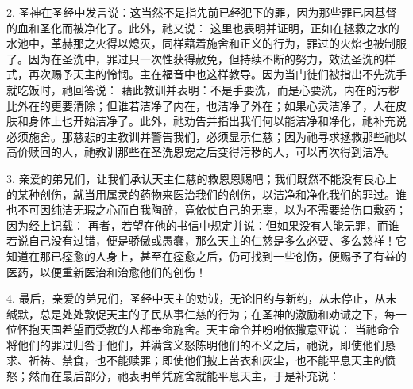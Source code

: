 2. 圣神在圣经中发言说：这当然不是指先前已经犯下的罪，因为那些罪已因基督的血和圣化而被净化了。此外，祂又说： 这里也表明并证明，正如在拯救之水的水池中，革赫那之火得以熄灭，同样藉着施舍和正义的行为，罪过的火焰也被制服了。因为在圣洗中，罪过只一次性获得赦免，但持续不断的努力，效法圣洗的样式，再次赐予天主的怜悯。主在福音中也这样教导。因为当门徒们被指出不先洗手就吃饭时，祂回答说： 藉此教训并表明：不是手要洗，而是心要洗，内在的污秽比外在的更要清除；但谁若洁净了内在，也洁净了外在；如果心灵洁净了，人在皮肤和身体上也开始洁净了。此外，祂劝告并指出我们何以能洁净和净化，祂补充说必须施舍。那慈悲的主教训并警告我们，必须显示仁慈；因为祂寻求拯救那些祂以高价赎回的人，祂教训那些在圣洗恩宠之后变得污秽的人，可以再次得到洁净。\par

3. 亲爱的弟兄们，让我们承认天主仁慈的救恩恩赐吧；我们既然不能没有良心上的某种创伤，就当用属灵的药物来医治我们的创伤，以洁净和净化我们的罪过。谁也不可因纯洁无瑕之心而自我陶醉，竟依仗自己的无辜，以为不需要给伤口敷药；因为经上记载： 再者，若望在他的书信中规定并说：但如果没有人能无罪，而谁若说自己没有过错，便是骄傲或愚蠢，那么天主的仁慈是多么必要、多么慈祥！它知道在那已痊愈的人身上，甚至在痊愈之后，仍可找到一些创伤，便赐予了有益的医药，以便重新医治和治愈他们的创伤！\par

4. 最后，亲爱的弟兄们，圣经中天主的劝诫，无论旧约与新约，从未停止，从未缄默，总是处处敦促天主的子民从事仁慈的行为；在圣神的激励和劝诫之下，每一位怀抱天国希望而受教的人都奉命施舍。天主命令并吩咐依撒意亚说： 当祂命令将他们的罪过归咎于他们，并满含义怒陈明他们的不义之后，祂说，即使他们恳求、祈祷、禁食，也不能赎罪；即使他们披上苦衣和灰尘，也不能平息天主的愤怒；然而在最后部分，祂表明单凭施舍就能平息天主，于是补充说： \par

